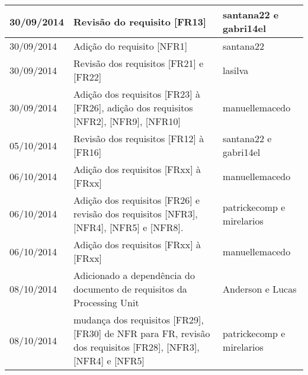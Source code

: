\documentclass{article}
\begin{document}
\begin{table}[ht]
\begin{tabular}[pos]{|m{2cm} | m{7.2cm} | m{3.8cm}|}
\small 30/09/2014 & \small Revisão do requisito [FR13] & \small santana22 e gabri14el \\ \hline

\small 30/09/2014 & \small Adição do requisito [NFR1] & \small santana22 \\ \hline

\small 30/09/2014 & \small Revisão dos requisitos [FR21] e [FR22] & \small lasilva\\ \hline

\small 30/09/2014 & \small Adição dos requisitos [FR23] à [FR26], adição dos requisitos [NFR2], [NFR9], [NFR10]  & \small manuellemacedo \\ \hline

\small 05/10/2014 & \small Revisão dos requisitos [FR12] à [FR16] & \small santana22 e gabri14el \\ \hline

\small 06/10/2014 & \small Adição dos requisitos [FRxx] à [FRxx] & \small manuellemacedo \\ \hline %

\small 06/10/2014 & \small Adição dos requisitos [FR26] e revisão dos requisitos [NFR3], [NFR4], [NFR5] e [NFR8].  & \small patrickecomp e mirelarios \\ \hline

\small 06/10/2014 & \small Adição dos requisitos [FRxx] à [FRxx] & \small manuellemacedo \\ \hline %

\small 08/10/2014 & \small Adicionado a dependência do documento de requisitos da Processing Unit & \small Anderson e Lucas \\ \hline 

\small 08/10/2014 & \small mudança dos requisitos [FR29], [FR30] de NFR para FR, revisão dos requisitos [FR28], [NFR3], [NFR4] e [NFR5] & \small patrickecomp e mirelarios \\ \hline
		\end{tabular}
	\end{table}
		
\newpage
		
\tableofcontents
\newpage
		
    
		
\end{document}

